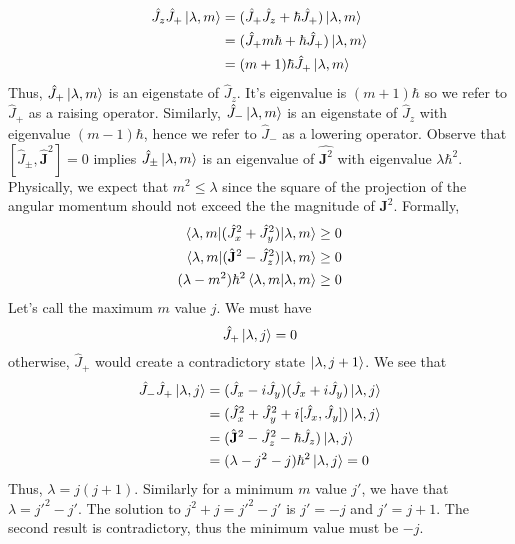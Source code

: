 \documentclass{report}
\begin{document}
\begin{align*}
	\hat J_z \hat J_+ \ket{\lambda, m} &= (\hat J_+ \hat J_z + \hbar \hat J_+) \ket{\lambda, m}\\
					   &= (\hat J_+ m \hbar + \hbar \hat J_+) \ket{\lambda, m}\\
					   &=(m+1)\hbar \hat J_+ \ket{\lambda, m}
\end{align*}
Thus, \(\hat J_+ \ket{\lambda, m}\) is an eigenstate of \(\hat J_z\). It's eigenvalue is \((m+1) \hbar\) so we refer to \(\hat J_+\) as a raising operator. Similarly, \(\hat J_- \ket{\lambda, m}\) is an eigenstate of \(\hat J_z\) with eigenvalue \((m-1) \hbar\), hence we refer to \(\hat J_-\) as a lowering operator. Observe that \([\hat J _\pm , \hat{\mathbf J}^2 ] = 0\) implies \(\hat J _ \pm \ket{\lambda, m}\) is an eigenvalue of \(\hat{\mathbf J^2}\) with eigenvalue \(\lambda \hbar ^2\). \\
Physically, we expect that \(m^2 \leq \lambda\) since the square of the projection of the angular momentum should not exceed the the magnitude of \(\mathbf J^2\). Formally, 
\begin{align*}
	\braket{\lambda, m | (\hat J_x^2 + \hat J_y ^ 2) | \lambda, m} &\geq 0\\
	\braket{\lambda, m | (\hat{\mathbf J}^2 - \hat J_z^2 )| \lambda, m} & \geq 0\\
	(\lambda - m^2) \hbar ^2 \braket{\lambda, m | \lambda, m} &\geq 0
\end{align*}
Let's call the maximum \(m\) value \(j\). We must have 
\[
\hat J_+ \ket{\lambda, j} = 0
\] 
otherwise, \(\hat J_+\) would create a contradictory state \(\ket{\lambda, j+ 1}\). We see that 
\begin{align*}
	\hat J_- \hat J_+ \ket{\lambda, j} &= (\hat J_x - i \hat J_y) (\hat J_x + i \hat J _y) \ket{\lambda, j} \\
					   &=(\hat J _x^2 + \hat J_y ^2 +i [\hat J_x, \hat J_y] )\ket{\lambda, j}\\
					   &=(\hat{\mathbf J}^2 - \hat J_z^2 -\hbar \hat J_z)\ket{\lambda, j}\\
					   &=(\lambda - j^2 - j) \hbar ^2 \ket{\lambda, j} = 0
\end{align*}
Thus, \(\lambda = j(j+1)\). Similarly for a minimum \(m\) value \(j'\), we have that \(\lambda = j'^2 - j'\). The solution to \(j^2 + j = j'^2 - j'\) is \(j' = -j\) and \(j' = j + 1\). The second result is contradictory, thus the minimum value must be \(-j\).  
\end{document}

